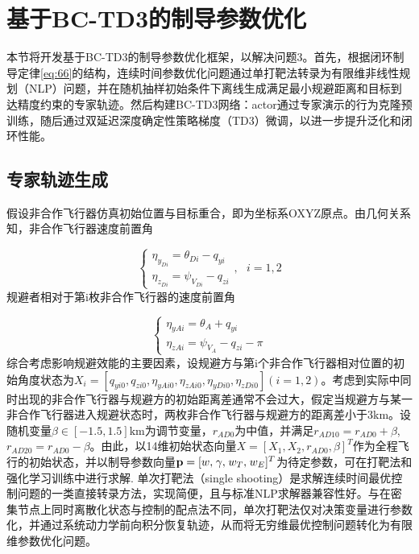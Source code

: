 \section{基于BC-TD3的制导参数优化}
本节将开发基于BC-TD3的制导参数优化框架，以解决问题3。首先，根据闭环制导定律\eqref{eq:66}的结构，连续时间参数优化问题通过单打靶法转录为有限维非线性规划（NLP）问题，并在随机抽样初始条件下离线生成满足最小规避距离和目标到达精度约束的专家轨迹。然后构建BC-TD3网络：actor通过专家演示的行为克隆预训练，随后通过双延迟深度确定性策略梯度（TD3）微调，以进一步提升泛化和闭环性能。

\subsection{专家轨迹生成}
假设非合作飞行器仿真初始位置与目标重合，即为坐标系OXYZ原点。由几何关系知，非合作飞行器速度前置角

\begin{equation}
\label{eq:67}
\left\{ {\begin{array}{*{20}{l}}
  {{\eta _{{y_{Di}}}} = {\theta _{Di}} - {q_{yi}}} \\ 
  {{\eta _{{z_{Di}}}} = {\psi _{{V_{Di}}}} - {q_{zi}}} 
\end{array},{\text{ }}i = 1,2} \right.
\end{equation}
规避者相对于第i枚非合作飞行器的速度前置角

\begin{equation}
\label{eq:68}
\left\{ {\begin{array}{*{20}{l}}
  {{\eta _{yAi}} = {\theta _A} + {q_{yi}}} \\ 
  {{\eta _{zAi}} = {\psi _{{V_A}}} - {q_{zi}} - \pi } 
\end{array}} \right.
\end{equation}
综合考虑影响规避效能的主要因素，设规避方与第i个非合作飞行器相对位置的初始角度状态为${X_i} = [{q_{yi0}},{q_{zi0}},{\eta _{yAi0}},{\eta _{zAi0}},{\eta _{yDi0}},{\eta _{zDi0}}](i = 1,2)$。考虑到实际中同时出现的非合作飞行器与规避方的初始距离差通常不会过大，假定当规避方与某一非合作飞行器进入规避状态时，两枚非合作飞行器与规避方的距离差小于3km。设随机变量$\beta  \in [ - 1.5,1.5]{\text{km}}$为调节变量，${r_{AD{\text{0}}}}$为中值，并满足${r_{AD10}} = {r_{AD0}} + \beta $, ${r_{AD20}} = {r_{AD0}} - \beta $。由此，以14维初始状态向量$X = {[{X_1},{X_2},{r_{AD0}},\beta ]^T}$作为全程飞行的初始状态，并以制导参数向量${\mathbf{p}} = {[w,{\kern 1pt} \gamma ,{\kern 1pt} {w_T},{\kern 1pt} {w_E}]^T}$为待定参数，可在打靶法和强化学习训练中进行求解.
单次打靶法（single shooting）是求解连续时间最优控制问题的一类直接转录方法，实现简便，且与标准NLP求解器兼容性好。与在密集节点上同时离散化状态与控制的配点法不同，单次打靶法仅对决策变量进行参数化，并通过系统动力学前向积分恢复轨迹，从而将无穷维最优控制问题转化为有限维参数优化问题。

